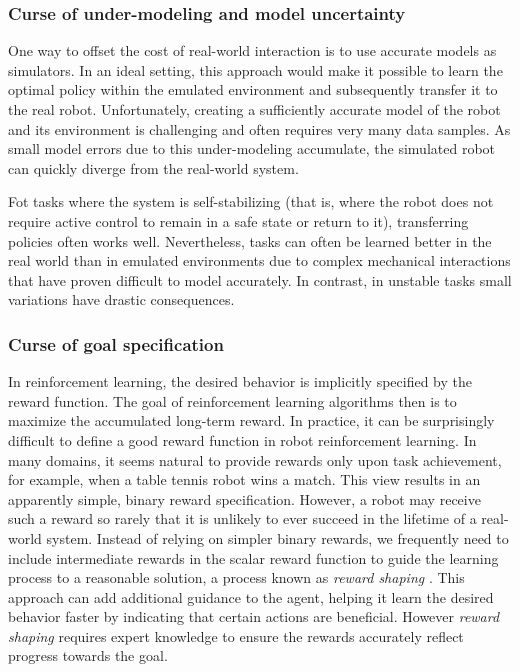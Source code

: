 \subsubsection{Curse of under-modeling and model uncertainty}
One way to offset the cost of real-world interaction is to use accurate models as simulators. In an ideal setting, this
approach would make it possible to learn the optimal policy within the emulated environment and subsequently transfer it to the real robot.
Unfortunately, creating a sufficiently accurate model of the robot and its environment is challenging and often requires
very many data samples. As small model errors due to this under-modeling accumulate, the simulated robot can
quickly diverge from the real-world system.

Fot tasks where the system is self-stabilizing (that is, where the robot does not require active control to remain in a safe state or return to it),
transferring policies often works well. Nevertheless, tasks can often be learned better in the real world than in emulated environments due to complex mechanical interactions
that have proven difficult to model accurately. In contrast, in unstable tasks small variations have drastic consequences. %

\subsubsection{Curse of goal specification}
In reinforcement learning, the desired behavior is implicitly specified by the reward function. The goal of reinforcement
learning algorithms then is to maximize the accumulated long-term reward. %
In practice, it can be surprisingly difficult to define a good reward function in robot reinforcement learning. 
In many domains, it seems natural to provide rewards only upon task achievement, for example, when a table tennis
robot wins a match. This view results in an apparently simple, binary reward specification. However, a robot may
receive such a reward so rarely that it is unlikely to ever succeed in the lifetime of a real-world system. Instead of
relying on simpler binary rewards, we frequently need to include intermediate rewards in the scalar reward function
to guide the learning process to a reasonable solution, a process known as \textit{reward shaping} \cite{Laud2004}.
This approach can add additional guidance to the agent, helping it learn the desired behavior faster by indicating that certain actions are beneficial.
However \textit{reward shaping} requires expert knowledge to ensure the rewards accurately reflect progress towards the goal.

